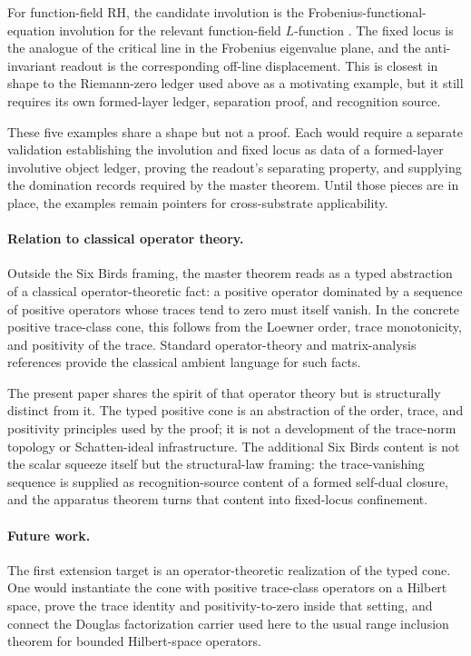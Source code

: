 \documentclass[11pt]{article}
\theoremstyle{definition}
\begin{document}
For function-field RH, the candidate involution is the
Frobenius-functional-equation involution for the relevant
function-field \(L\)-function \citep{Weil1948a,Weil1948b,Stepanov1969,Bombieri1974}.
The fixed locus is the analogue of the critical line in the
Frobenius eigenvalue plane, and the anti-invariant readout is the
corresponding off-line displacement.  This is closest in shape to
the Riemann-zero ledger used above as a motivating example, but it
still requires its own formed-layer ledger, separation proof, and
recognition source.

These five examples share a shape but not a proof.  Each would
require a separate validation establishing the involution and
fixed locus as data of a formed-layer involutive object ledger,
proving the readout's separating property, and supplying the
domination records required by the master theorem.  Until those
pieces are in place, the examples remain pointers for
cross-substrate applicability.

\paragraph{Relation to classical operator theory.}
Outside the Six Birds framing, the master theorem reads as a typed
abstraction of a classical operator-theoretic fact: a positive
operator dominated by a sequence of positive operators whose traces
tend to zero must itself vanish.  In the concrete positive
trace-class cone, this follows from the Loewner order, trace
monotonicity, and positivity of the trace.  Standard operator-theory
and matrix-analysis references
\citep{ReedSimon1980,Simon2005,Bhatia1997,HornJohnson2013} provide
the classical ambient language for such facts.

The present paper shares the spirit of that operator theory but is
structurally distinct from it.  The typed positive cone is an
abstraction of the order, trace, and positivity principles used by
the proof; it is not a development of the trace-norm topology or
Schatten-ideal infrastructure.  The additional Six Birds content is
not the scalar squeeze itself but the structural-law framing: the
trace-vanishing sequence is supplied as recognition-source content
of a formed self-dual closure, and the apparatus theorem turns
that content into fixed-locus confinement.

\paragraph{Future work.}
The first extension target is an operator-theoretic realization of
the typed cone.  One would instantiate the cone with positive
trace-class operators on a Hilbert space, prove the trace identity
and positivity-to-zero inside that setting, and connect the
Douglas factorization carrier used here to the usual range
inclusion theorem for bounded Hilbert-space operators.
\end{document}
